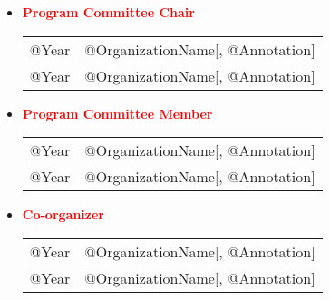 \documentclass[10pt]{article}
\renewcommand{\new}[1]{\textcolor{red}{#1}}
\begin{document}
\begin{itemize}
\item[] \textbf{\new{Program Committee Chair}}
\\[1.3ex]
\begin{tabular}{l@{\quad\ }p{34em}} 
 @Year & @OrganizationName[, @Annotation]
 \\[.5ex]
 @Year & @OrganizationName[, @Annotation]
\end{tabular}

\item[] \textbf{\new{Program Committee Member}}
\\[1.3ex]
\begin{tabular}{l@{\quad\ }p{34em}} 
 @Year & @OrganizationName[, @Annotation]
 \\[.5ex]
 @Year & @OrganizationName[, @Annotation]
\end{tabular}

\item[] \textbf{\new{Co-organizer}}
\\[1.3ex]
\begin{tabular}{l@{\quad\ }p{34em}} 
 @Year & @OrganizationName[, @Annotation]
 \\[.5ex]
 @Year & @OrganizationName[, @Annotation]
\end{tabular}

\end{itemize}
\end{document}
